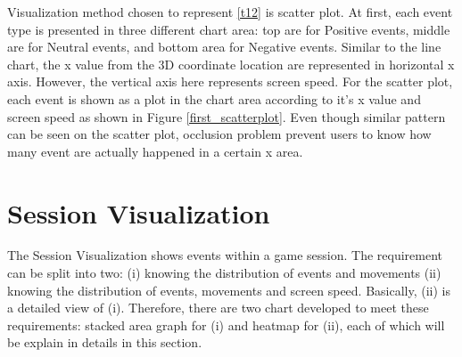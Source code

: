 Visualization method chosen to represent \ref{t12} is scatter plot. At first, each event type is presented in three different chart area: top are for Positive events, middle are for Neutral events, and bottom area for Negative events. Similar to the line chart, the x value from the 3D coordinate location are represented in horizontal x axis. However, the vertical axis here represents screen speed. For the scatter plot, each event is shown as a plot in the chart area according to it's x value and screen speed as shown in Figure \ref{first_scatterplot}. Even though similar pattern can be seen on the scatter plot, occlusion problem prevent users to know how many event are actually happened in a certain x area.

\section{Session Visualization}
The Session Visualization shows events within a game session. The requirement can be split into two: (i) knowing the distribution of events and movements (ii) knowing the distribution of events, movements and screen speed. Basically, (ii) is a detailed view of (i). Therefore, there are two chart developed to meet these requirements: stacked area graph for (i) and heatmap for (ii), each of which will be explain in details in this section.

